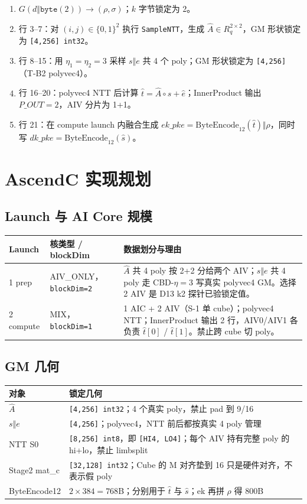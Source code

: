 \documentclass[UTF8,a4paper,11pt]{ctexart}
\begin{document}
\begin{enumerate}
  \item $G(d\Vert \texttt{byte}(2))\to(\rho,\sigma)$；$k$ 字节锁定为 2。
  \item 行 3--7：对 $(i,j)\in\{0,1\}^2$ 执行 \texttt{SampleNTT}，生成 $\hat A\in R_q^{2\times2}$，GM 形状锁定为 \texttt{[4,256] int32}。
  \item 行 8--15：用 $\eta_1=\eta_2=3$ 采样 $s\Vert e$ 共 4 个 poly；GM 形状锁定为 \texttt{[4,256]}（T-B2 polyvec4）。
  \item 行 16--20：polyvec4 NTT 后计算 $\hat t=\hat A\circ\hat s+\hat e$；InnerProduct 输出 $P\_OUT=2$，AIV 分片为 1+1。
  \item 行 21：在 compute launch 内融合生成 $ek\_pke=\text{ByteEncode}_{12}(\hat t)\Vert\rho$，同时写 $dk\_pke=\text{ByteEncode}_{12}(\hat s)$。
\end{enumerate}

\section{AscendC 实现规划}

\subsection{Launch 与 AI Core 规模}

\begin{longtable}{@{}L{2.5cm}L{3.0cm}L{7.6cm}@{}}
\toprule
Launch & 核类型 / blockDim & 数据划分与理由 \\
 prep & AIV\_ONLY，\texttt{blockDim=2} & $\hat A$ 共 4 poly 按 2+2 分给两个 AIV；$s\Vert e$ 共 4 poly 走 CBD-$\eta=3$ 写真实 polyvec4 GM。选择 2 AIV 是 D13 k2 探针已验锁定值。 \\
2 compute & MIX，\texttt{blockDim=1} & 1 AIC + 2 AIV（S-1 单 cube）；polyvec4 NTT；InnerProduct 输出 2 行，AIV0/AIV1 各负责 $\hat t[0]$ / $\hat t[1]$。禁止跨 cube 切 poly。 \\
\bottomrule
\end{longtable}

\subsection{GM 几何}

\begin{longtable}{@{}L{3.7cm}L{9.5cm}@{}}
\toprule
对象 & 锁定几何 \\
\midrule
$\hat A$ & \texttt{[4,256] int32}；4 个真实 poly，禁止 pad 到 9/16 \\
$s\Vert e$ & \texttt{[4,256]}；polyvec4，NTT 前后都按真实 4 poly 管理 \\
NTT S0 & \texttt{[8,256] int8}，即 \texttt{[HI4, LO4]}；每个 AIV 持有完整 poly 的 hi+lo，禁止 limbsplit \\
Stage2 mat\_c & \texttt{[32,128] int32}；Cube 的 M 对齐垫到 16 只是硬件对齐，不表示假 poly \\
ByteEncode12 & $2\times384=768$B；分别用于 $\hat t$ 与 $\hat s$；ek 再拼 $\rho$ 得 800B \\
\bottomrule
\end{longtable}
\end{document}
